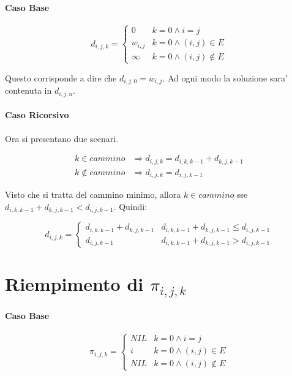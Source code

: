 \paragraph{Caso Base}

\[
    d_{i,j,k} = 
    \begin{cases}
        0 & k = 0 \land i = j\\
        w_{i,j} & k = 0 \land (i,j) \in E \\
        \infty & k = 0 \land (i,j) \notin E
    \end{cases}
\]

Questo corrisponde a dire che $d_{i,j,0} = w_{i,j}$.
Ad ogni modo la soluzione sara' contenuta in $d_{i,j,n}$.

\paragraph{Caso Ricorsivo}

Ora si presentano due scenari.

\begin{align*}
    k \in cammino & \Rightarrow d_{i,j,k} = d_{i,k,k-1} + d_{k,j,k-1} \\
    k \notin cammino & \Rightarrow d_{i,j,k} = d_{i,j,k-1}
\end{align*}

Visto che si tratta del cammino minimo, allora $k \in cammino$ sse $d_{i,k,k-1} + d_{k,j,k-1} < d_{i,j,k-1}$.
Quindi:

\[
    d_{i,j,k} = 
    \begin{cases}
        d_{i,k,k-1} + d_{k,j,k-1} & d_{i,k,k-1} + d_{k,j,k-1} \leq d_{i,j,k-1} \\
        d_{i,j,k-1} & d_{i,k,k-1} + d_{k,j,k-1} > d_{i,j,k-1} 
    \end{cases}
\]

\section{Riempimento di $\pi_{i,j,k}$}

\paragraph{Caso Base}

\[
    \pi_{i,j,k} = 
    \begin{cases}
        NIL & k = 0 \land i = j\\
        i & k = 0 \land (i,j) \in E \\
        NIL & k = 0 \land (i,j) \notin E
    \end{cases}
\]

